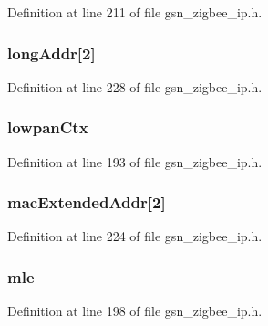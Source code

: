 Definition at line 211 of file gsn\_\-zigbee\_\-ip.h.

\hypertarget{a00440_a8ab771887ab75e0ebb14c47d0ab1bca4}{
\subsubsection[{longAddr}]{ {\bf longAddr}\mbox{[}2\mbox{]}}}
\label{a00440_a8ab771887ab75e0ebb14c47d0ab1bca4}


Definition at line 228 of file gsn\_\-zigbee\_\-ip.h.

\hypertarget{a00440_a5471b017312565942c51038afa3c7428}{
\subsubsection[{lowpanCtx}]{ {\bf lowpanCtx}}}
\label{a00440_a5471b017312565942c51038afa3c7428}


Definition at line 193 of file gsn\_\-zigbee\_\-ip.h.

\hypertarget{a00440_acdbdc3eb6e942e1f888ea5147db2bcd6}{
\subsubsection[{macExtendedAddr}]{ {\bf macExtendedAddr}\mbox{[}2\mbox{]}}}
\label{a00440_acdbdc3eb6e942e1f888ea5147db2bcd6}


Definition at line 224 of file gsn\_\-zigbee\_\-ip.h.

\hypertarget{a00440_af6ac1eebeeae7f32a274a7cd914f9bd8}{
\subsubsection[{mle}]{ {\bf mle}}}
\label{a00440_af6ac1eebeeae7f32a274a7cd914f9bd8}


Definition at line 198 of file gsn\_\-zigbee\_\-ip.h.

